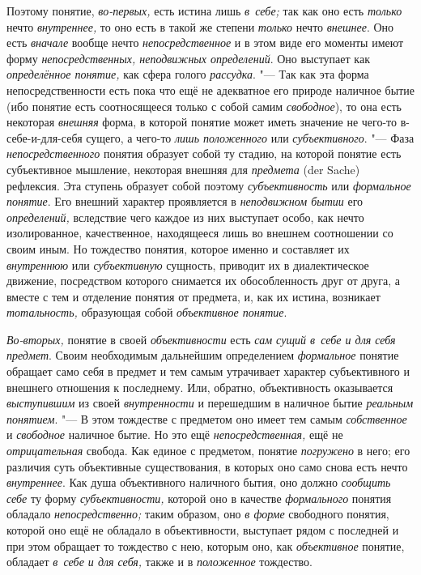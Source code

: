 Поэтому понятие, {\em во-первых,} есть истина лишь {\em в~себе;}
так как оно есть {\em только} нечто {\em внутреннее,} то оно
есть в такой же степени {\em только} нечто {\em внешнее}.
Оно есть {\em вначале} вообще нечто {\em непосредственное} и
в этом виде его моменты имеют форму {\em непосредственных, неподвижных
определений}. Оно выступает как {\em определённое понятие,}
как сфера голого {\em рассудка}. "--- Так как
эта форма непосредственности есть пока что ещё не адекватное его природе
наличное бытие (ибо понятие есть соотносящееся только с собой самим
{\em свободное}), то она есть некоторая {\em внешняя}
форма, в которой понятие может иметь значение не чего-то
в-себе-и-для-себя сущего, а чего-то {\em лишь положенного}
или {\em субъективного}. "--- Фаза {\em непосредственного}
понятия образует собой ту стадию, на которой понятие есть
субъективное мышление, некоторая внешняя для {\em предмета} (der Sache)
рефлексия. Эта ступень образует собой поэтому {\em субъективность} или
{\em формальное понятие}. Его внешний характер проявляется в
{\em неподвижном бытии} его {\em определений,}
вследствие чего каждое из них выступает особо, как нечто
изолированное, качественное, находящееся лишь во внешнем соотношении со
своим иным. Но тождество понятия, которое именно и составляет их
{\em внутреннюю} или {\em субъективную}
сущность, приводит их в диалектическое движение, посредством
которого снимается их обособленность друг от друга, а вместе с тем и
отделение понятия от предмета, и, как их истина, возникает
{\em тотальность,} образующая собой {\em объективное понятие}.

{\em Во-вторых,} понятие в своей {\em объективности}
есть {\em сам сущий в~себе и для себя предмет}. Своим необходимым дальнейшим
определением {\em формальное}
понятие обращает само себя в предмет и тем самым утрачивает
характер субъективного и внешнего отношения к последнему. Или, обратно,
объективность оказывается {\em выступившим} из своей {\em внутренности}
и перешедшим в наличное бытие {\em реальным понятием}. "---
В этом тождестве с предметом оно имеет тем самым {\em собственное} и
{\em свободное} наличное бытие. Но это ещё {\em непосредственная,}
ещё не {\em отрицательная} свобода. Как единое с предметом, понятие
{\em погружено} в него;
его различия суть объективные существования, в которых оно само снова есть
нечто {\em внутреннее}. Как душа объективного наличного бытия, оно должно
{\em сообщить себе} ту форму {\em субъективности,} которой оно в качестве
{\em формального} понятия обладало {\em непосредственно;} таким образом, оно
{\em в форме} свободного понятия, которой оно ещё не обладало в
объективности, выступает рядом с последней и при этом обращает то тождество
с нею, которым оно, как {\em объективное} понятие, обладает
{\em в~себе и для себя,} также и в {\em положенное} тождество.

